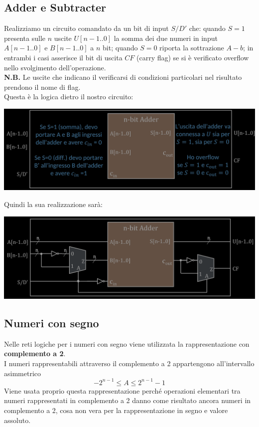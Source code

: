 \documentclass{article}
\begin{document}
\subsection{Adder e Subtracter}
Realizziamo un circuito comandato da un bit di input $S/D'$ che: quando $S=1$ presenta sulle $n$ uscite $U[n-1. . 0] $ la somma dei due numeri in input $A[n-1. . 0]$ e  $B[n-1. . 0]$ a $n$ bit; quando $S = 0 $ riporta la sottrazione $A-b$; in entrambi i casi asserisce il bit di uscita $CF$ (carry flag) se si è verificato overflow nello svolgimento dell’operazione.\\
\textbf{N.B.} Le uscite che indicano il verificarsi di condizioni particolari nel risultato prendono il nome di flag.
\vspace{0.1cm}\\
Questa è la logica dietro il nostro circuito:
\begin{center}
    \includegraphics[scale=0.35]{adder-sub.png}
\end{center}
Quindi la sua realizzazione sarà:
\begin{center}
    \includegraphics[scale=0.35]{adder-sub2.png}
\end{center}



\subsection{Numeri con segno}
Nelle reti logiche per i numeri con segno viene utilizzata la rappresentazione con \textbf{\color{cyan} complemento a 2}.\\
I numeri rappresentabili attraverso il complemento a 2 appartengono all'intervallo asimmetrico
$$ - 2^{n-1} \leq A \leq 2^{n-1}-1 $$
Viene usata proprio questa rappresentazione perché operazioni elementari tra numeri rappresentati in complemento a 2 danno come risultato ancora numeri in complemento a 2, cosa non vera per la rappresentazione in segno e valore assoluto.
\end{document}
